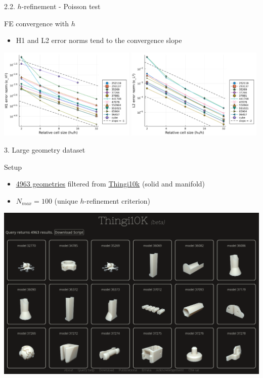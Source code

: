 \documentclass{beamer}
\begin{document}
\begin{frame}{2.2. $h$-refinement - Poisson test}
  \begin{block}{FE convergence with $h$}
  \begin{itemize}
    \item
      H1 and L2 error norms tend to the convergence slope
  \end{itemize}
  \end{block}

  \includegraphics[width=0.49\textwidth]{../analysis/plots/x_nmax_y_error_h1}
  \includegraphics[width=0.49\textwidth]{../analysis/plots/x_nmax_y_error_l2}
\end{frame}

\begin{frame}{3. Large geometry dataset}
  \begin{block}{Setup}
    \begin{itemize}
      \item
        \href{https://ten-thousand-models.appspot.com/results.html?q=is+solid\%2C+is+manifold}
        {\underline{4963 geometries}}
        filtered from \href{https://ten-thousand-models.appspot.com}{Thingi10k}
        (solid and manifold)
      \item
        $N_{max} = 100 $ (unique $h$-refinement criterion)
    \end{itemize}

  \end{block}

  \centering
  \includegraphics[width=.75\textwidth]{thingi10k_screenshot}
\end{frame}
\end{document}
